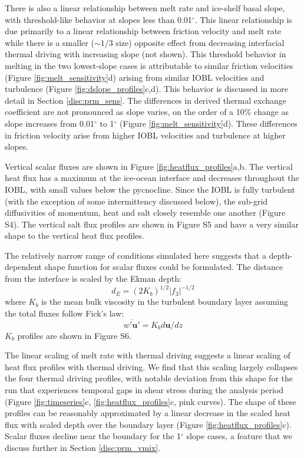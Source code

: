 \documentclass[draft]{agujournal2019}
\begin{document}
There is also a linear relationship between melt rate and ice-shelf basal slope, with threshold-like behavior at slopes less than 0.01$^{\circ}$. This linear relationship is due primarily to a linear relationship between friction velocity and melt rate while there is a smaller ($\sim\!1/3$ size) opposite effect from decreasing interfacial thermal driving with increasing slope (not shown). This threshold behavior in melting in the two lowest-slope cases is attributable to similar friction velocities (Figure \ref{fig:melt_sensitivity}d) arising from similar IOBL velocities and turbulence  (Figure \ref{fig:dslope_profiles}c,d). This behavior is discussed in more detail in Section \ref{disc:prm_sens}. The differences in derived thermal exchange coefficient are not pronounced as slope varies, on the order of a 10\% change as slope increases from 0.01$^{\circ}$ to 1$^{\circ}$ (Figure \ref{fig:melt_sensitivity}d). These differences in friction velocity arise from higher IOBL velocities and turbulence at higher slopes. 

Vertical scalar fluxes are shown in Figure \ref{fig:heatflux_profiles}a,b. The vertical heat flux has a maximum at the ice-ocean interface and decreases throughout the IOBL, with small values below the pycnocline. Since the IOBL is fully turbulent (with the exception of some intermittency discussed below), the sub-grid diffusivities of momentum, heat and salt closely resemble one another (Figure S4). The vertical salt flux profiles are shown in Figure S5 and have a very similar shape to the vertical heat flux profiles.

The relatively narrow range of conditions simulated here suggests that a depth-dependent shape function for scalar fluxes could be formulated. The distance from the interface is scaled by the Ekman depth:
\begin{equation}
    d_E = (2 K_b)^{1/2} |f_3|^{-1/2}
\end{equation}
where $K_{b}$ is the mean bulk viscosity in the turbulent boundary layer assuming the total fluxes follow Fick's law:
\begin{equation}
    \overline{w'\mathbf{u}'} = K_{b} d\mathbf{u}/dz
\end{equation}
$K_b$ profiles are shown in Figure S6. 

The linear scaling of melt rate with thermal driving suggests a linear scaling of heat flux profiles with thermal driving. We find that this scaling largely collapses the four thermal driving profiles, with notable deviation from this shape for the run that experiences temporal gaps in shear stress during the analysis period (Figure \ref{fig:timeseries}c, \ref{fig:heatflux_profiles}c,  pink curves). The shape of these profiles can be reasonably approximated by a linear decrease in the scaled heat flux with scaled depth over the boundary layer (Figure \ref{fig:heatflux_profiles}c). Scalar fluxes decline near the boundary for the 1$^{\circ}$ slope cases, a feature that we discuss further in Section \ref{disc:prm_vmix}. 
\end{document}
